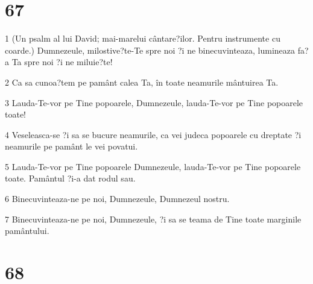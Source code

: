 \chapter{67}

\par 1 (Un psalm al lui David; mai-marelui cântare?ilor. Pentru instrumente cu coarde.) Dumnezeule, milostive?te-Te spre noi ?i ne binecuvinteaza, lumineaza fa?a Ta spre noi ?i ne miluie?te!
\par 2 Ca sa cunoa?tem pe pamânt calea Ta, în toate neamurile mântuirea Ta.
\par 3 Lauda-Te-vor pe Tine popoarele, Dumnezeule, lauda-Te-vor pe Tine popoarele toate!
\par 4 Veseleasca-se ?i sa se bucure neamurile, ca vei judeca popoarele cu dreptate ?i neamurile pe pamânt le vei povatui.
\par 5 Lauda-Te-vor pe Tine popoarele Dumnezeule, lauda-Te-vor pe Tine popoarele toate. Pamântul ?i-a dat rodul sau.
\par 6 Binecuvinteaza-ne pe noi, Dumnezeule, Dumnezeul nostru.
\par 7 Binecuvinteaza-ne pe noi, Dumnezeule, ?i sa se teama de Tine toate marginile pamântului.

\chapter{68}

